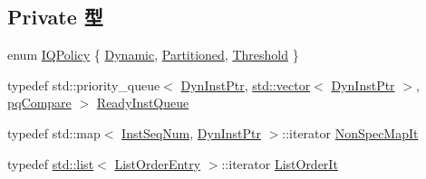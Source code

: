 \subsection*{Private 型}
\begin{DoxyCompactItemize}
\item 
enum \hyperlink{classInstructionQueue_a6af49ff20e9c3b3f7ef7b8fa74c0e31b}{IQPolicy} \{ \hyperlink{classInstructionQueue_a6af49ff20e9c3b3f7ef7b8fa74c0e31ba96535b1625776102bcc13f7dfb598dcb}{Dynamic}, 
\hyperlink{classInstructionQueue_a6af49ff20e9c3b3f7ef7b8fa74c0e31badd8dfa69b567f90d3f13d819109ab74e}{Partitioned}, 
\hyperlink{classInstructionQueue_a6af49ff20e9c3b3f7ef7b8fa74c0e31ba267544c4de8ecc66bd0fed6310af63be}{Threshold}
 \}
\item 
typedef std::priority\_\-queue$<$ \hyperlink{classInstructionQueue_a028ce10889c5f6450239d9e9a7347976}{DynInstPtr}, \hyperlink{classstd_1_1vector}{std::vector}$<$ \hyperlink{classInstructionQueue_a028ce10889c5f6450239d9e9a7347976}{DynInstPtr} $>$, \hyperlink{structInstructionQueue_1_1pqCompare}{pqCompare} $>$ \hyperlink{classInstructionQueue_a60636ae8f3b649078c4f1bdd3b20dcad}{ReadyInstQueue}
\item 
typedef std::map$<$ \hyperlink{inst__seq_8hh_a258d93d98edaedee089435c19ea2ea2e}{InstSeqNum}, \hyperlink{classInstructionQueue_a028ce10889c5f6450239d9e9a7347976}{DynInstPtr} $>$::iterator \hyperlink{classInstructionQueue_a0e9597437fae9e60d5449933949416ec}{NonSpecMapIt}
\item 
typedef \hyperlink{classstd_1_1list}{std::list}$<$ \hyperlink{structInstructionQueue_1_1ListOrderEntry}{ListOrderEntry} $>$::iterator \hyperlink{classInstructionQueue_a120a1fba4fe015f7201e896580df164c}{ListOrderIt}
\end{DoxyCompactItemize}
